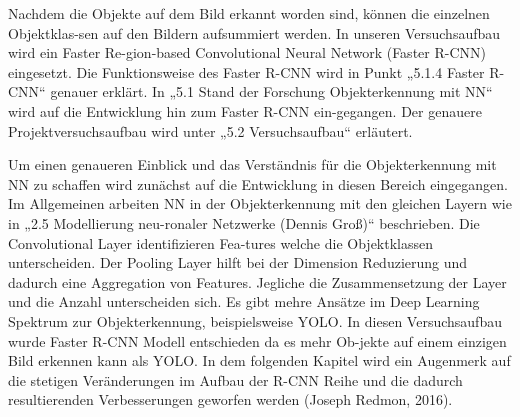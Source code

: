 \documentclass{llncs}
\begin{document}
Nachdem die Objekte auf dem Bild erkannt worden sind, können die einzelnen Objektklas-sen auf den Bildern aufsummiert werden. In unseren Versuchsaufbau wird ein Faster Re-gion-based Convolutional Neural Network (Faster R-CNN) eingesetzt. Die Funktionsweise des Faster R-CNN wird in Punkt „5.1.4 Faster R-CNN“ genauer erklärt. In „5.1 Stand der Forschung Objekterkennung mit NN“ wird auf die Entwicklung hin zum Faster R-CNN ein-gegangen. Der genauere Projektversuchsaufbau wird unter „5.2 Versuchsaufbau“ erläutert.
 
Um einen genaueren Einblick und das Verständnis für die Objekterkennung mit NN zu schaffen wird zunächst auf die Entwicklung in diesen Bereich eingegangen. Im Allgemeinen arbeiten NN in der Objekterkennung mit den gleichen Layern wie in „2.5 Modellierung neu-ronaler Netzwerke (Dennis Groß)“ beschrieben. Die Convolutional Layer identifizieren Fea-tures welche die Objektklassen unterscheiden. Der Pooling Layer hilft bei der Dimension Reduzierung und dadurch eine Aggregation von Features. Jegliche die Zusammensetzung der Layer und die Anzahl unterscheiden sich.
Es gibt mehre Ansätze im Deep Learning Spektrum zur Objekterkennung, beispielsweise YOLO. In diesen Versuchsaufbau wurde Faster R-CNN Modell entschieden da es mehr Ob-jekte auf einem einzigen Bild erkennen kann als YOLO. In dem folgenden Kapitel wird ein Augenmerk auf die stetigen Veränderungen im Aufbau der R-CNN Reihe und die dadurch resultierenden Verbesserungen geworfen werden (Joseph Redmon, 2016).
\end{document}

